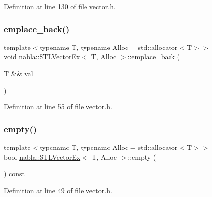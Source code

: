 Definition at line 130 of file vector.\+h.

\mbox{\label{classnabla_1_1_s_t_l_vector_ex_a66394a10b1e5e1a5bbe0cfa6198a48f8}} 
\subsubsection{\texorpdfstring{emplace\_back()}{emplace\_back()}}
{\footnotesize\ttfamily template$<$typename T, typename Alloc = std\+::allocator$<$\+T$>$$>$ \\
void \mbox{\hyperlink{classnabla_1_1_s_t_l_vector_ex}{nabla\+::\+S\+T\+L\+Vector\+Ex}}$<$ T, Alloc $>$\+::emplace\+\_\+back (\begin{DoxyParamCaption}\item[{T \&\&}]{val }\end{DoxyParamCaption})\hspace{0.3cm}{\ttfamily [inline]}}



Definition at line 55 of file vector.\+h.

\mbox{\label{classnabla_1_1_s_t_l_vector_ex_a4f7dc09d999e0d82fae18a2d7fb4c1e8}} 
\subsubsection{\texorpdfstring{empty()}{empty()}}
{\footnotesize\ttfamily template$<$typename T, typename Alloc = std\+::allocator$<$\+T$>$$>$ \\
bool \mbox{\hyperlink{classnabla_1_1_s_t_l_vector_ex}{nabla\+::\+S\+T\+L\+Vector\+Ex}}$<$ T, Alloc $>$\+::empty (\begin{DoxyParamCaption}{ }\end{DoxyParamCaption}) const\hspace{0.3cm}{\ttfamily [inline]}}



Definition at line 49 of file vector.\+h.

\mbox{\label{classnabla_1_1_s_t_l_vector_ex_ad7749220f425a7c8393c2896aa47e029}} 
